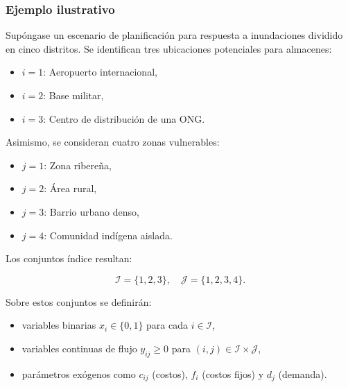 \documentclass[
  spanish,
  us-letterpaper,
  DIV=11,
  numbers=noendperiod]{scrreprt}
\providecommand{\tightlist}{%
  \setlength{\itemsep}{0pt}\setlength{\parskip}{0pt}}
\numberwithin{equation}{section}
\begin{document}
\subsubsection{\texorpdfstring{\textbf{Ejemplo
ilustrativo}}{Ejemplo ilustrativo}}\label{ejemplo-ilustrativo}

Supóngase un escenario de planificación para respuesta a inundaciones
dividido en cinco distritos. Se identifican tres ubicaciones potenciales
para almacenes:

\begin{itemize}
\tightlist
\item
  \(i = 1\): Aeropuerto internacional,\\
\item
  \(i = 2\): Base militar,\\
\item
  \(i = 3\): Centro de distribución de una ONG.
\end{itemize}

Asimismo, se consideran cuatro zonas vulnerables:

\begin{itemize}
\tightlist
\item
  \(j = 1\): Zona ribereña,\\
\item
  \(j = 2\): Área rural,\\
\item
  \(j = 3\): Barrio urbano denso,\\
\item
  \(j = 4\): Comunidad indígena aislada.
\end{itemize}

Los conjuntos índice resultan:

\[\mathcal{I} = \{1,2,3\}, \quad 
\mathcal{J} = \{1,2,3,4\}.\]

Sobre estos conjuntos se definirán:

\begin{itemize}
\tightlist
\item
  variables binarias \(x_i \in \{0,1\}\) para cada
  \(i \in \mathcal{I}\),\\
\item
  variables continuas de flujo \(y_{ij} \ge 0\) para
  \((i,j) \in \mathcal{I} \times \mathcal{J}\),\\
\item
  parámetros exógenos como \(c_{ij}\) (costos), \(f_i\) (costos fijos) y
  \(d_j\) (demanda).
\end{itemize}
\end{document}

